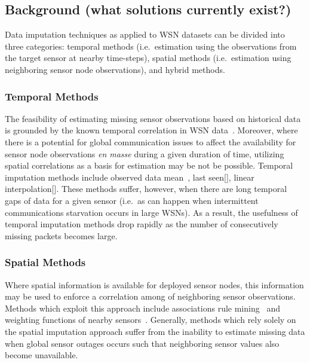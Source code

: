 \subsection{Background (what solutions currently exist?)}
Data imputation techniques as applied to WSN datasets can be divided into three categories:
temporal methods (i.e.\ estimation using the observations from the target sensor at nearby time-steps), 
spatial methods (i.e.\ estimation using neighboring sensor node observations), 
and hybrid methods.

\subsubsection{Temporal Methods}
The feasibility of estimating missing sensor observations based on historical data is grounded by the known temporal correlation in WSN data~\cite{akyildiz2004exploiting}.
Moreover, where there is a potential for global communication issues to affect the availability for sensor node observations \emph{en masse} during a given duration of time, utilizing spatial correlations as a basis for estimation may be not be possible.
Temporal imputation methods include observed data mean~\cite{madden2005tinydb,setz2009combining}, last seen[], linear interpolation[].
These methods suffer, however, when there are long temporal gaps of data for a given sensor (i.e.\ as can happen when intermittent communications starvation occurs in large WSNs).
As a result, the usefulness of temporal imputation methods drop rapidly as the number of consecutively missing packets becomes large.

\subsubsection{Spatial Methods}
Where spatial information is available for deployed sensor nodes, this information may be used to enforce a correlation among of neighboring sensor observations.
Methods which exploit this approach include associations rule mining~\cite{le2005estimating,jiang2007estimating} and weighting functions of nearby sensors~\cite{li2008spatial,li2008data,pan2010k}.
Generally, methods which rely solely on the spatial imputation approach suffer from the inability to estimate missing data when global sensor outages occurs such that neighboring sensor values also become unavailable.

